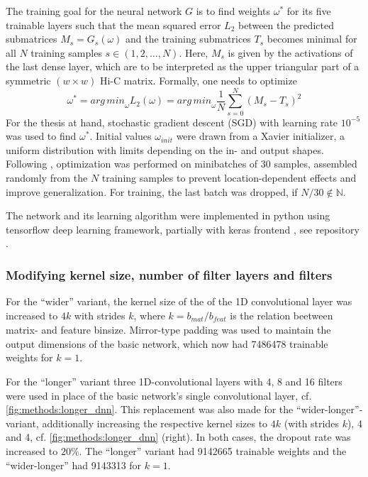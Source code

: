 The training goal for the neural network $G$ is to find weights $\omega^*$ for its five trainable layers 
such that the mean squared error $L_2$ between the predicted submatrices $M_s = G_s(\omega)$ 
and the training submatrices $T_s$ becomes minimal for all $N$ training samples $s \in (1,2,\dots, N)$. 
Here, $M_s$ is given by the activations of the last dense layer, which are to be interpreted as the upper triangular 
part of a symmetric $(w\times w)$ Hi-C matrix.
Formally, one needs to optimize
\begin{equation}
 \omega^* = \mathit{arg\,min}_\omega L_2(\omega) = \mathit{arg\,min}_\omega \frac{1}{N} \sum_{s=0}^N (M_s - T_s)^2 \label{eq:methods:nn-mse}
\end{equation} 
For the thesis at hand, stochastic gradient descent (SGD) with learning rate $10^{-5}$  was used to find $\omega^*$.
Initial values $\omega_\mathit{init}$ were drawn from a Xavier initializer, a uniform distribution with limits depending on the in- and output shapes.
Following \cite{Farre2018a}, optimization was performed on minibatches of 30 samples, assembled randomly from the $N$ training samples
to prevent location-dependent effects and improve generalization.
For training, the last batch was dropped, if $N/30 \not \in \mathbb{N}$. 

The network and its learning algorithm were implemented in python using tensorflow deep learning framework, partially with keras frontend \cite{Abadi2015,Chollet2015}, 
see repository \xxx.

\subsubsection{Modifying kernel size, number of filter layers and filters} \label{sec:methods:variants}
For the ``wider'' variant, the kernel size of the of the 1D convolutional layer was increased to $4k$ with strides $k$,
where $k=b_\mathit{mat}/b_\mathit{feat}$ is the relation beetween matrix- and feature binsize.
Mirror-type padding was used to maintain the output dimensions of the basic network, which now had \SI{7486478}{} trainable weights
for $k=1$.

For the ``longer'' variant three 1D-convolutional layers with 4, 8 and 16 filters 
were used in place of the basic network's single convolutional layer, cf. \cref{fig:methods:longer_dnn}.
This replacement was also made for the ``wider-longer''-variant, 
additionally increasing the respective kernel sizes to $4k$ (with strides $k$), 4 and 4, cf. \cref{fig:methods:longer_dnn} (right).
In both cases, the dropout rate was increased to 20\%.
The ``longer'' variant had \SI{9142665}{} trainable weights and the ``wider-longer''
had \SI{9143313}{} for $k=1$.

